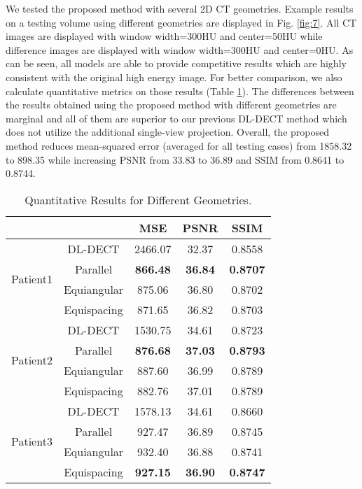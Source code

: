 \documentclass[journal,twoside,web]{ieeecolor}
\begin{document}
We tested the proposed method with several 2D CT geometries. Example results on a testing volume using different geometries are displayed in Fig. \ref{fig:7}. All CT images are displayed with window width=300HU and center=50HU while difference images are displayed with window width=300HU and center=0HU. As can be seen, all models are able to provide competitive results which are highly consistent with the original high energy image. For better comparison, we also calculate quantitative metrics on those results (Table \ref{tab:4}). The differences between the results obtained using the proposed method with different geometries are marginal and all of them are superior to our previous DL-DECT method which does not utilize the additional single-view projection. Overall, the proposed method reduces mean-squared error (averaged for all testing cases) from 1858.32 to 898.35 while increasing PSNR from 33.83 to 36.89 and SSIM from 0.8641 to 0.8744.

\begin{table}[b]%
    \begin{center}
        \caption{Quantitative Results for Different Geometries.}
        \begin{tabular}{ c c | c c c }
            \hline\hline
            \multicolumn{2}{c}{} & MSE & PSNR & SSIM \\
            \hline
            \multirow{4}{*}{Patient1} & DL-DECT & 2466.07 & 32.37 & 0.8558 \\
            & Parallel & \textbf{866.48} & \textbf{36.84} & \textbf{0.8707} \\
            & Equiangular & 875.06 & 36.80 & 0.8702 \\
            & Equispacing & 871.65 & 36.82 & 0.8703 \\
            \hline
            \multirow{4}{*}{Patient2} & DL-DECT & 1530.75 & 34.61 & 0.8723 \\
            & Parallel & \textbf{876.68} & \textbf{37.03} & \textbf{0.8793} \\
            & Equiangular & 887.60 & 36.99 & 0.8789 \\
            & Equispacing & 882.76 & 37.01 & 0.8789 \\
            \hline
            \multirow{4}{*}{Patient3} & DL-DECT & 1578.13 & 34.61 & 0.8660 \\
            & Parallel & 927.47 & 36.89 & 0.8745 \\
            & Equiangular & 932.40 & 36.88 & 0.8741 \\
            & Equispacing & \textbf{927.15} & \textbf{36.90} & \textbf{0.8747} \\
            \hline\hline
        \end{tabular}
        \label{tab:4}
    \end{center}
\end{table}
\end{document}
